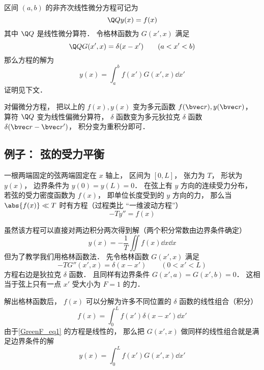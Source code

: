 
\begin{issues}
\issueDraft
\end{issues}


区间 $(a,b)$ 的非齐次线性微分方程可记为
\begin{equation}\label{GreenF_eq5}
\Q Q y(x) = f(x)
\end{equation}
其中 $\Q Q$ 是线性微分算符． 令格林函数为 $G(x', x)$ 满足
\begin{equation}\label{GreenF_eq7}
\Q Q G(x', x) = \delta(x - x') \qquad (a < x' < b)
\end{equation}
那么方程的解为
\begin{equation}\label{GreenF_eq4}
y(x) = \int_a^b f(x') G(x', x) \dd{x'}
\end{equation}
证明见下文．

对偏微分方程， 把以上的 $f(x), y(x)$ 变为多元函数 $f(\bvec r), y(\bvec r)$， 算符 $\Q Q$ 变为线性偏微分算符， $\delta$ 函数变为多元狄拉克 $\delta$ 函数 $\delta(\bvec r - \bvec r')$， 积分变为重积分即可．

\subsection{例子： 弦的受力平衡}
一根两端固定的弦两端固定在 $x$ 轴上， 区间为 $[0, L]$， 张力为 $T$， 形状为 $y(x)$， 边界条件为 $y(0) = y(L) = 0$． 在弦上有 $y$ 方向的连续受力分布， 若弦的受力密度函数为 $f(x)$， 即单位长度受到的 $y$ 方向的力， 那么当 $\abs{f(x)} \ll T$ 时有方程（过程类比 “一维波动方程”）
\begin{equation}\label{GreenF_eq1}
-T y'' = f(x)
\end{equation}

虽然该方程可以直接对两边积分两次得到解（两个积分常数由边界条件确定）
\begin{equation}
y(x) = -\frac{1}{T}\iint f(x) \dd{x}\dd{x}
\end{equation}
但为了教学我们用格林函数法． 先令格林函数 $G(x', x)$ 满足
\begin{equation}\label{GreenF_eq2}
-T G''(x', x) = \delta(x - x') \qquad (0 < x' < L)
\end{equation}
方程右边是狄拉克 $\delta$ 函数． 且同样有边界条件 $G(x', a) = G(x', b) = 0$． 这相当于弦上只有一点 $x'$ 受大小为 $F = 1$ 的力．

解出格林函数后， $f(x)$ 可以分解为许多不同位置的 $\delta$ 函数的线性组合（积分）
\begin{equation}
f(x) = \int_0^L f(x') \delta(x - x') \dd{x'}
\end{equation}
由于\autoref{GreenF_eq1} 的方程是线性的， 那么把 $G(x', x)$ 做同样的线性组合就是满足边界条件的解
\begin{equation}\label{GreenF_eq3}
y(x) = \int_0^L f(x') G(x', x) \dd{x'}
\end{equation}

